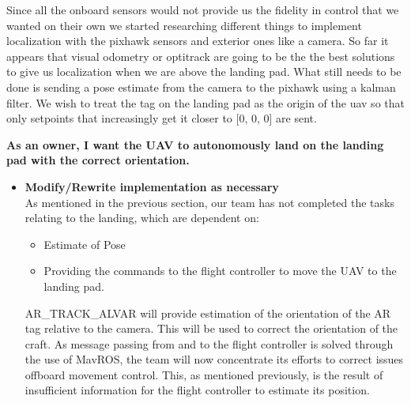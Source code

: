 \begin{itemize}
\begin{itemize}
\noindent Since all the onboard sensors would not provide us the fidelity in control that we wanted on their own we started researching different things to implement localization with the pixhawk sensors and exterior ones like a camera. So far it appears that visual odometry or optitrack are going to be the the best solutions to give us localization when we are above the landing pad. What still needs to be done is sending a pose estimate from the camera to the pixhawk using a kalman filter. We wish to treat the tag on the landing pad as the origin of the uav so that only setpoints that increasingly get it closer to [0, 0, 0] are sent.\par

\end{itemize}

\end{itemize}



\vspace{3mm}
\noindent \large{\textbf{As an owner, I want the UAV to autonomously land on the landing pad with the correct orientation.}}
\normalsize
\begin{itemize}
\item \textbf{Modify/Rewrite implementation as necessary}\\
As mentioned in the previous section, our team has not completed the tasks relating to the landing, which are dependent on:
\begin{itemize}
\item Estimate of Pose
\item Providing the commands to the flight controller to move the UAV to the landing pad.
\end{itemize}
AR\_TRACK\_ALVAR will provide estimation of the orientation of the AR tag relative to the camera. This will be used to correct the orientation of the craft. As message passing from and to the flight controller is solved through the use of MavROS, the team will now concentrate its efforts to correct issues offboard movement control. This, as mentioned previously, is the result of insufficient information for the flight controller to estimate its position.
\end{itemize}

